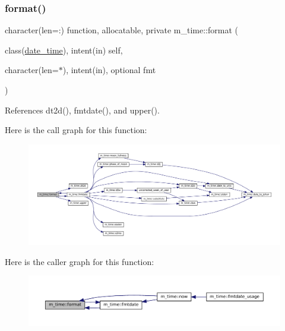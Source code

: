\subsubsection{\texorpdfstring{format()}{format()}}
{\footnotesize\ttfamily character(len=\+:) function, allocatable, private m\+\_\+time\+::format (\begin{DoxyParamCaption}\item[{class(\mbox{\hyperlink{structm__time_1_1date__time}{date\+\_\+time}}), intent(in)}]{self,  }\item[{character(len=$\ast$), intent(in), optional}]{fmt }\end{DoxyParamCaption})\hspace{0.3cm}{\ttfamily [private]}}



References dt2d(), fmtdate(), and upper().

Here is the call graph for this function\+:\nopagebreak
\begin{figure}[H]
\begin{center}
\leavevmode
\includegraphics[width=350pt]{namespacem__time_a8d843c997d304f40fd5aed820c5a7473_cgraph}
\end{center}
\end{figure}
Here is the caller graph for this function\+:\nopagebreak
\begin{figure}[H]
\begin{center}
\leavevmode
\includegraphics[width=350pt]{namespacem__time_a8d843c997d304f40fd5aed820c5a7473_icgraph}
\end{center}
\end{figure}
\mbox{\label{namespacem__time_aae8c0dfd78a61889a0d6444448ac0bb9}} 
